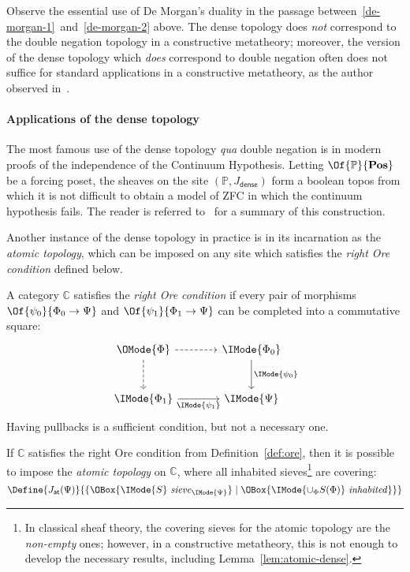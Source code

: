 \documentclass{article}
\newcommand\Posets{\mathbf{Pos}}
\newcommand\IsSieve[2]{\IMode{#2}\ \mathit{sieve}_{\IMode{#1}}}
\newcommand\JAtomic{J_{\mathsf{at}}}
\newcommand\JDense{J_{\mathsf{dense}}}
\newcommand\IsInh[1]{\IMode{#1}\ \mathit{inhabited}}
\begin{document}
\begin{remark}
  Observe the essential use of De Morgan's duality in the passage
  between~\ref{de-morgan-1}~and~\ref{de-morgan-2} above. The dense
  topology does \emph{not} correspond to the double negation topology
  in a constructive metatheory; moreover, the version of the dense
  topology which \emph{does} correspond to double negation often does
  not suffice for standard applications in a constructive metatheory,
  as the author observed
  in~\cite{sterling:math-stack-exchange-dense-topology}.
\end{remark}

\paragraph{Applications of the dense topology}
The most famous use of the dense topology \emph{qua} double negation
is in modern proofs of the independence of the Continuum
Hypothesis. Letting $\Of{\mathbb{P}}{\Posets}$ be a forcing poset, the
sheaves on the site $(\mathbb{P},\JDense)$ form a boolean topos from
which it is not difficult to obtain a model of ZFC in which the
continuum hypothesis fails. The reader is referred
to~\cite{maclane-moerdijk:1992} for a summary of this construction.

Another instance of the dense topology in practice is in its
incarnation as the \emph{atomic topology}, which can be imposed on any
site which satisfies the \emph{right Ore condition} defined below.

\begin{definition}\label{def:ore}
  A category $\mathbb{C}$ satisfies the \emph{right Ore condition} if
  every pair of morphisms
  $\Of{\psi_0}{\Phi_0\to\Psi}$ and
  $\Of{\psi_1}{\Phi_1\to\Psi}$ can be completed into
  a commutative square:
  \[
    \begin{tikzcd}[sep=large]
      \OMode{\Phi}
      \arrow[r,dashed]
      \arrow[d,dashed]
      &
      \IMode{\Phi_0}
      \arrow[d,"\IMode{\psi_0}"]
      \\
      \IMode{\Phi_1}
      \arrow[r,swap,"\IMode{\psi_1}"]
      &
      \IMode{\Psi}
    \end{tikzcd}
  \]
  Having pullbacks is a sufficient condition, but not a necessary one.
\end{definition}

\begin{definition}
  If $\mathbb{C}$ satisfies the right Ore condition from
  Definition~\ref{def:ore}, then it is possible to impose the
  \emph{atomic topology} on $\mathbb{C}$, where all inhabited
  sieves\footnote{In classical sheaf theory, the covering sieves for
    the atomic topology are the \emph{non-empty} ones; however, in a
    constructive metatheory, this is not enough to develop the
    necessary results, including Lemma~\ref{lem:atomic-dense}.}  are
  covering:
  \[
    \Define{
      \JAtomic(\Psi)
    }{
      \MkSet{
        \OBox{\IsSieve{\Psi}{S}}
        \mid
        \OBox{\IsInh{\cup_\Phi S(\Phi)}}
      }
    }
  \]
\end{definition}
\end{document}
